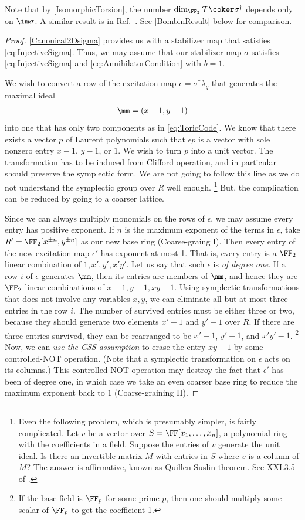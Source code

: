 Note that by \ref{IsomorphicTorsion}, 
the number $\dim_{\FF_2} \mathcal T \coker \sigma^\dagger$
depends only on $\im \sigma$.
A similar result is in Ref.~\cite{Bombin2011Structure}.
See \ref{BombinResult} below for comparison.

\begin{proof}
\ref{Canonical2Dsigma} provides us with a stabilizer map that satisfies \eqref{eq:InjectiveSigma}.
Thus, we may assume that our stabilizer map $\sigma$ satisfies \eqref{eq:InjectiveSigma}
and \eqref{eq:AnnihilatorCondition} with $b=1$.

We wish to convert a row of the excitation map $\epsilon = \sigma^\dagger \lambda_q$
that generates the maximal ideal 
\begin{align}
\mm = (x -1, y-1)
\end{align}
into one that has only two components as in \eqref{eq:ToricCode}.
We know that there exists a vector $p$ of Laurent polynomials
such that $\epsilon p$ is a vector with sole nonzero entry $x-1$, $y-1$, or $1$.
We wish to turn $p$ into a unit vector.
The transformation has to be induced from Clifford operation,
and in particular should preserve the symplectic form.
We are not going to follow this line
as we do not understand the symplectic group over $R$
well enough.%
\footnote{
Even the following problem, which is presumably simpler,
is fairly complicated.
Let $v$ be a vector over $S = \FF[x_1,\ldots,x_n]$, a polynomial ring with the coefficients in a field.
Suppose the entries of $v$ generate the unit ideal.
Is there an invertible matrix $M$ with entries in $S$ where $v$ is a column of $M$?
The answer is affirmative, known as Quillen-Suslin theorem.
See XXI.3.5 of \cite{Lang}.
}
But, the complication can be reduced by going to a coarser lattice.


Since we can always multiply monomials on the rows of $\epsilon$,
we may assume every entry has positive exponent.
If $n$ is the maximum exponent of the terms in $\epsilon$,
take $R' = \FF_2[x^{\pm n}, y^{\pm n}]$ as our new base ring
(Coarse-graing I).
Then every entry of the new excitation map $\epsilon'$
has exponent at most 1. That is,
every entry is a $\FF_2$-linear combination of $1,x',y',x'y'$.
Let us say that such $\epsilon$ is \emph{of degree one}.
If a row $i$ of $\epsilon$ generates $\mm$,
then its entries are members of $\mm$,
and hence they are $\FF_2$-linear combinations of $x-1,y-1,xy-1$.
Using symplectic transformations that does not involve any variables $x,y$,
we can eliminate all but at most three entries in the row $i$.
The number of survived entries must be either three or two,
because they should generate two elements $x'-1$ and $y'-1$ over $R$.
If there are three entries survived,
they can be rearranged to be $x'-1$, $y'-1$, and $x'y'-1$.%
\footnote{If the base field is $\FF_p$ for some prime $p$,
then one should multiply some scalar of $\FF_p$ to get the coefficient 1.}
Now, we can \emph{use the CSS assumption}
to erase the entry $xy-1$ by some controlled-NOT operation.
(Note that a symplectic transformation on $\epsilon$ acts on its columns.)
This controlled-NOT operation may
destroy the fact that $\epsilon'$ has been of degree one,
in which case we take an even coarser base ring to reduce
the maximum exponent back to $1$ (Coarse-graining II).


\end{proof}
